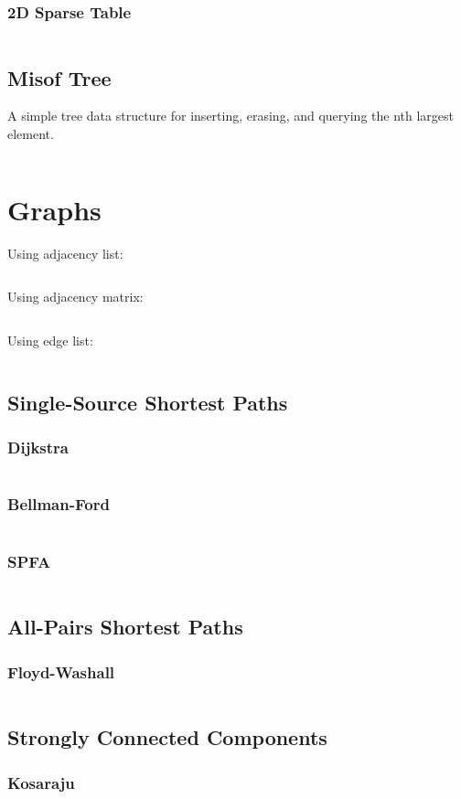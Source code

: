 \documentclass[8pt,a4paper,landscape,oneside]{amsart}
\newcommand{\code}[1]{\inputminted[fontsize=\normalsize,baselinestretch=1]{cpp}{_code/#1}}
\begin{document}
\begin{multicols*}{3}
    \subsubsection{2D Sparse Table}
      \code{data-structures/sparse_2d.cpp}
  \subsection{Misof Tree}
    A simple tree data structure for inserting, erasing, and querying the nth largest element.
    \code{data-structures/misof_tree.cpp}
\section{Graphs}
	Using adjacency list:
	\code{graphs/graph_template_adjlist.cpp}
	Using adjacency matrix:
	\code{graphs/graph_template_adjmat.cpp}
	Using edge list:
	\code{graphs/graph_template_edgelist.cpp}
	\subsection{Single-Source Shortest Paths}
		\subsubsection{Dijkstra}
			\code{graphs/shortest_paths/dijkstra.cpp}
		\subsubsection{Bellman-Ford}
			\code{graphs/shortest_paths/bellman_ford.cpp}
    \subsubsection{SPFA}
      \code{graphs/shortest_paths/spfa.cpp}
	\subsection{All-Pairs Shortest Paths}
		\subsubsection{Floyd-Washall}
			\code{graphs/shortest_paths/floyd_warshall.cpp}
	\subsection{Strongly Connected Components}
		\subsubsection{Kosaraju}
      \code{graphs/scc/kosaraju.cpp}

\end{multicols*}
\end{document}
